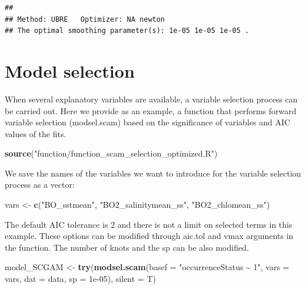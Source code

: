 \documentclass[
]{book}
\newenvironment{Shaded}{\begin{snugshade}}{\end{snugshade}}
\newcommand{\AttributeTok}[1]{\textcolor[rgb]{0.13,0.29,0.53}{#1}}
\newcommand{\FloatTok}[1]{\textcolor[rgb]{0.00,0.00,0.81}{#1}}
\newcommand{\FunctionTok}[1]{\textcolor[rgb]{0.13,0.29,0.53}{\textbf{#1}}}
\newcommand{\NormalTok}[1]{#1}
\newcommand{\OtherTok}[1]{\textcolor[rgb]{0.56,0.35,0.01}{#1}}
\newcommand{\StringTok}[1]{\textcolor[rgb]{0.31,0.60,0.02}{#1}}
\begin{document}
\begin{verbatim}
## 
## Method: UBRE   Optimizer: NA newton
## The optimal smoothing parameter(s): 1e-05 1e-05 1e-05 .
\end{verbatim}

\section{Model selection}\label{model-selection}

When several explanatory variables are available, a variable selection process can be carried out. Here we provide as an example, a function that performs forward variable selection (modsel.scam) based on the significance of variables and AIC values of the fits.

\begin{Shaded}
\begin{Highlighting}[]
\FunctionTok{source}\NormalTok{(}\StringTok{"function/function\_scam\_selection\_optimized.R"}\NormalTok{)}
\end{Highlighting}
\end{Shaded}

We save the names of the variables we want to introduce for the variable selection process as a vector:

\begin{Shaded}
\begin{Highlighting}[]
\NormalTok{vars }\OtherTok{\textless{}{-}} \FunctionTok{c}\NormalTok{(}\StringTok{"BO\_sstmean"}\NormalTok{, }\StringTok{"BO2\_salinitymean\_ss"}\NormalTok{,}
    \StringTok{"BO2\_chlomean\_ss"}\NormalTok{)}
\end{Highlighting}
\end{Shaded}

The default AIC tolerance is 2 and there is not a limit on selected terms in this example. These options can be modified through aic.tol and vmax arguments in the function. The number of knots and the sp can be also modified.

\begin{Shaded}
\begin{Highlighting}[]
\NormalTok{model\_SCGAM }\OtherTok{\textless{}{-}} \FunctionTok{try}\NormalTok{(}\FunctionTok{modsel.scam}\NormalTok{(}\AttributeTok{basef =} \StringTok{"occurrenceStatus \textasciitilde{} 1"}\NormalTok{,}
    \AttributeTok{vars =}\NormalTok{ vars, }\AttributeTok{dat =}\NormalTok{ data, }\AttributeTok{sp =} \FloatTok{1e{-}05}\NormalTok{),}
    \AttributeTok{silent =}\NormalTok{ T)}
\end{Highlighting}
\end{Shaded}
\end{document}
